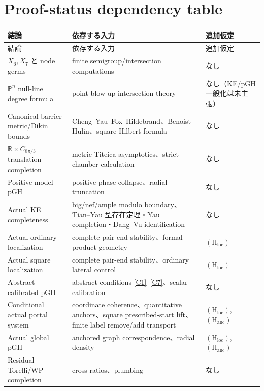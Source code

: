 \documentclass[11pt,a4paper]{ltjsarticle}
\newcommand{\PP}{\mathbb P}\newcommand{\RR}{\mathbb R}\newcommand{\CC}{\mathbb C}
\newcommand{\Hloc}{\ensuremath{(\mathrm H_{\mathrm{loc}})}}
\newcommand{\Hanc}{\ensuremath{(\mathrm H_{\mathrm{anc}})}}
\theoremstyle{plain}
\theoremstyle{definition}
\theoremstyle{remark}
\begin{document}
\section{Proof-status dependency table}\label{app:dependency}
\begin{longtable}{@{}p{}p{}p{}@{}}
\toprule
結論 & 依存する入力 & 追加仮定\\
\midrule
\endfirsthead
\toprule
結論 & 依存する入力 & 追加仮定\\
\midrule
\endhead
$X_6,X_7$ と node germs & finite semigroup/intersection computations & なし\\
$\PP^n$ null-line degree formula & point blow-up intersection theory & なし（KE/pGH一般化は未主張）\\
Canonical barrier metric/Dikin bounds & Cheng--Yau--Fox--Hildebrand、Benoist--Hulin、square Hilbert formula & なし\\
$\RR\times C_{8\pi/3}$ translation completion & metric Titeica asymptotics、strict chamber calculation & なし\\
Positive model pGH & positive phase collapse、radial truncation & なし\\
Actual KE completeness & big/nef/ample modulo boundary、Tian--Yau 型存在定理・Yau completion・Dang--Vu identification & なし\\
Actual ordinary localization & complete pair-end stability、formal product geometry & \Hloc\\
Actual square localization & complete pair-end stability、ordinary lateral control & \Hloc\\
Abstract calibrated pGH & abstract conditions \ref{C1}--\ref{C7}、scalar calibration & なし\\
Conditional actual portal system & coordinate coherence、quantitative anchors、square prescribed-start lift、finite label remove/add transport & \Hloc, \Hanc\\
Actual global pGH & anchored graph correspondence、radial density & \Hloc, \Hanc\\
Residual Torelli/WP completion & cross-ratios、plumbing & なし\\
\bottomrule
\end{longtable}
\end{document}
